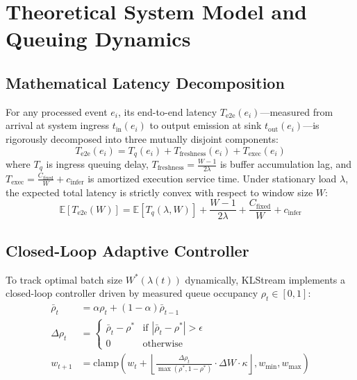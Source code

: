 \documentclass[conference,10pt]{IEEEtran}
\begin{document}
\section{Theoretical System Model and Queuing Dynamics}
\subsection{Mathematical Latency Decomposition}
For any processed event $e_i$, its end-to-end latency $T_{\text{e2e}}(e_i)$—measured from arrival at system ingress $t_{\text{in}}(e_i)$ to output emission at sink $t_{\text{out}}(e_i)$—is rigorously decomposed into three mutually disjoint components:
\begin{equation}
T_{\text{e2e}}(e_i) = T_q(e_i) + T_{\text{freshness}}(e_i) + T_{\text{exec}}(e_i)
\end{equation}
where $T_q$ is ingress queuing delay, $T_{\text{freshness}} = \frac{W - 1}{2\lambda}$ is buffer accumulation lag, and $T_{\text{exec}} = \frac{C_{\text{fixed}}}{W} + c_{\text{infer}}$ is amortized execution service time. Under stationary load $\lambda$, the expected total latency is strictly convex with respect to window size $W$:
\begin{equation}
\mathbb{E}[T_{\text{e2e}}(W)] = \mathbb{E}[T_q(\lambda, W)] + \frac{W - 1}{2\lambda} + \frac{C_{\text{fixed}}}{W} + c_{\text{infer}}
\end{equation}

\subsection{Closed-Loop Adaptive Controller}
To track optimal batch size $W^*(\lambda(t))$ dynamically, KLStream implements a closed-loop controller driven by measured queue occupancy $\rho_t \in [0, 1]$:
\begin{align}
\bar{\rho}_t &= \alpha \rho_t + (1 - \alpha)\bar{\rho}_{t-1} \\
\Delta\rho_t &= \begin{cases} \bar{\rho}_t - \rho^* & \text{if } |\bar{\rho}_t - \rho^*| > \epsilon \\ 0 & \text{otherwise} \end{cases} \\
w_{t+1} &= \text{clamp}\left(w_t + \left\lfloor \frac{\Delta\rho_t}{\max(\rho^*, 1 - \rho^*)} \cdot \Delta W \cdot \kappa \right\rfloor, w_{\min}, w_{\max}\right)
\end{align}
\end{document}
